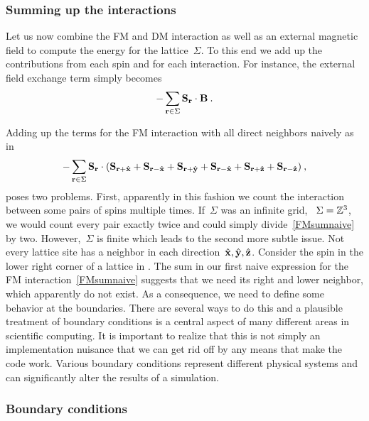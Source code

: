 \subsubsection{Summing up the interactions}

Let us now combine the FM and DM interaction as well as an external magnetic
field to compute the energy for the lattice~$\Sigma$. To this end we add up the
contributions from each spin and for each interaction. For instance, the
external field exchange term simply becomes
%
\begin{equation}\label{Bsum}
  -\sum_{\mathbf{r} \in \Sigma} \mathbf{S}_{\mathbf{r}} \cdot \mathbf{B}\:.
\end{equation}
%

Adding up the terms for the FM interaction with all direct neighbors naively as
in
%
\begin{equation}\label{FMsumnaive}
  -\sum_{\mathbf{r} \in \Sigma} \mathbf{S}_{\mathbf{r}} \cdot (\mathbf{S}_{\mathbf{r} + \hat{\mathbf{x}}} + \mathbf{S}_{\mathbf{r} - \hat{\mathbf{x}}} +
    \mathbf{S}_{\mathbf{r} + \hat{\mathbf{y}}} + \mathbf{S}_{\mathbf{r} - \hat{\mathbf{x}}} + \mathbf{S}_{\mathbf{r} + \hat{\mathbf{z}}} + \mathbf{S}_{\mathbf{r} - \hat{\mathbf{z}}})\:,
\end{equation}
%
poses two problems. First, apparently in this fashion we count the interaction
between some pairs of spins multiple times. If~$\Sigma$ was an infinite grid,
\ie{}~$\Sigma=\mathbb{Z}^3$, we would count every pair exactly twice and could simply
divide~\eqref{FMsumnaive} by two. However,~$\Sigma$ is finite which leads
to the second more subtle issue. Not every lattice site has a neighbor in each
direction~$\hat{\mathbf{x}}, \hat{\mathbf{y}}, \hat{\mathbf{z}}$. Consider the spin in the lower right corner of a
lattice in . The sum in our first naive expression for the
FM interaction~\eqref{FMsumnaive} suggests that we need its right and lower
neighbor, which apparently do not exist. As a consequence, we need to define
some behavior at the boundaries. There are several ways to do this and a
plausible treatment of boundary conditions is a central aspect of many different
areas in scientific computing. It is important to realize that this is not
simply an implementation nuisance that we can get rid off by any means that make
the code work. Various boundary conditions represent different physical systems
and can significantly alter the results of a simulation.

\subsubsection{Boundary conditions}

